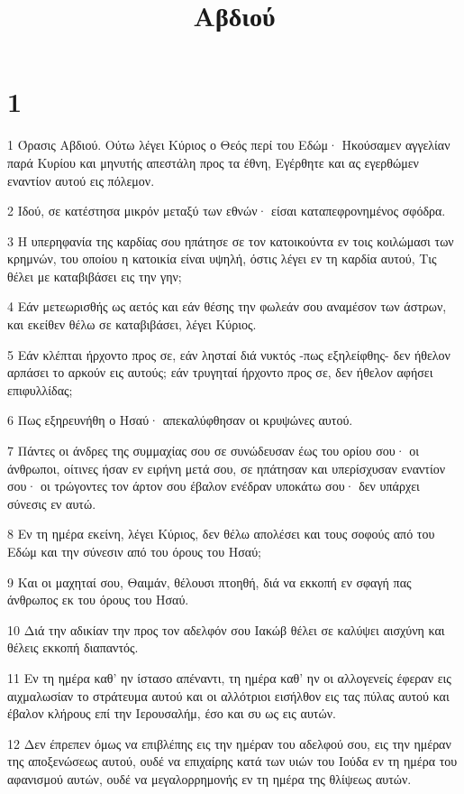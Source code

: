 

\title{Αβδιού}


\chapter{1}

\par 1 Όρασις Αβδιού. Ούτω λέγει Κύριος ο Θεός περί του Εδώμ· Ηκούσαμεν αγγελίαν παρά Κυρίου και μηνυτής απεστάλη προς τα έθνη, Εγέρθητε και ας εγερθώμεν εναντίον αυτού εις πόλεμον.
\par 2 Ιδού, σε κατέστησα μικρόν μεταξύ των εθνών· είσαι καταπεφρονημένος σφόδρα.
\par 3 Η υπερηφανία της καρδίας σου ηπάτησε σε τον κατοικούντα εν τοις κοιλώμασι των κρημνών, του οποίου η κατοικία είναι υψηλή, όστις λέγει εν τη καρδία αυτού, Τις θέλει με καταβιβάσει εις την γην;
\par 4 Εάν μετεωρισθής ως αετός και εάν θέσης την φωλεάν σου αναμέσον των άστρων, και εκείθεν θέλω σε καταβιβάσει, λέγει Κύριος.
\par 5 Εάν κλέπται ήρχοντο προς σε, εάν λησταί διά νυκτός -πως εξηλείφθης- δεν ήθελον αρπάσει το αρκούν εις αυτούς; εάν τρυγηταί ήρχοντο προς σε, δεν ήθελον αφήσει επιφυλλίδας;
\par 6 Πως εξηρευνήθη ο Ησαύ· απεκαλύφθησαν οι κρυψώνες αυτού.
\par 7 Πάντες οι άνδρες της συμμαχίας σου σε συνώδευσαν έως του ορίου σου· οι άνθρωποι, οίτινες ήσαν εν ειρήνη μετά σου, σε ηπάτησαν και υπερίσχυσαν εναντίον σου· οι τρώγοντες τον άρτον σου έβαλον ενέδραν υποκάτω σου· δεν υπάρχει σύνεσις εν αυτώ.
\par 8 Εν τη ημέρα εκείνη, λέγει Κύριος, δεν θέλω απολέσει και τους σοφούς από του Εδώμ και την σύνεσιν από του όρους του Ησαύ;
\par 9 Και οι μαχηταί σου, Θαιμάν, θέλουσι πτοηθή, διά να εκκοπή εν σφαγή πας άνθρωπος εκ του όρους του Ησαύ.
\par 10 Διά την αδικίαν την προς τον αδελφόν σου Ιακώβ θέλει σε καλύψει αισχύνη και θέλεις εκκοπή διαπαντός.
\par 11 Εν τη ημέρα καθ' ην ίστασο απέναντι, τη ημέρα καθ' ην οι αλλογενείς έφεραν εις αιχμαλωσίαν το στράτευμα αυτού και οι αλλότριοι εισήλθον εις τας πύλας αυτού και έβαλον κλήρους επί την Ιερουσαλήμ, έσο και συ ως εις αυτών.
\par 12 Δεν έπρεπεν όμως να επιβλέπης εις την ημέραν του αδελφού σου, εις την ημέραν της αποξενώσεως αυτού, ουδέ να επιχαίρης κατά των υιών του Ιούδα εν τη ημέρα του αφανισμού αυτών, ουδέ να μεγαλορρημονής εν τη ημέρα της θλίψεως αυτών.
